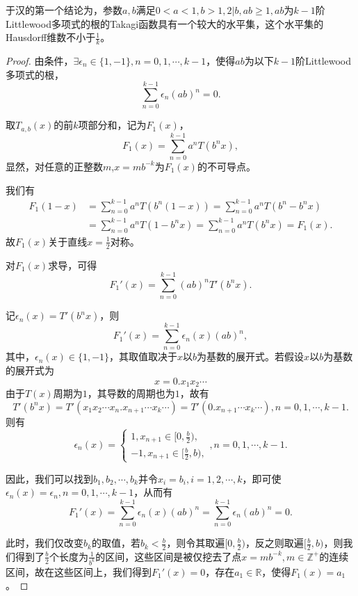 于汉的第一个结论为，参数$a,b$满足$0<a<1,b>1,2|b,ab\ge1,ab$为$k-1$阶Littlewood多项式的根的Takagi函数具有一个较大的水平集，这个水平集的Hausdorff维数不小于$\frac{1}{k}$。

\begin{proof}
    由条件，$\exists\epsilon_n\in\{1,-1\},n=0,1,\cdots,k-1$，使得$ab$为以下$k-1$阶Littlewood多项式的根，
    $$
        \sum_{n=0}^{k-1}\epsilon_n(ab)^n=0.
    $$

    取$T_{a,b}(x)$的前$k$项部分和，记为$F_1(x)$，
    $$
        F_1(x)=\sum_{n=0}^{k-1}a^nT(b^nx),
    $$
    显然，对任意的正整数$m$,$x=mb^{-k}$为$F_1(x)$的不可导点。

    我们有
    $$
        \begin{aligned}
            F_1(1-x) & =\sum_{n=0}^{k-1}a^nT(b^n(1-x))=\sum_{n=0}^{k-1}a^nT(b^n-b^nx) \\
                   & =\sum_{n=0}^{k-1}a^nT(1-b^nx)=\sum_{n=0}^{k-1}a^nT(b^nx)=F_1(x).
        \end{aligned}
    $$
    故$F_1(x)$关于直线$x=\frac{1}{2}$对称。

    对$F_1(x)$求导，可得
    $$
        F_1'(x)=\sum_{n=0}^{k-1}(ab)^nT'(b^nx).
    $$

    记$\epsilon_n(x)=T'(b^nx)$，则
    $$
        F_1'(x)=\sum_{n=0}^{k-1}\epsilon_n(x)(ab)^n,
    $$
    其中，$\epsilon_n(x)\in\{1,-1\}$，其取值取决于$x$以$b$为基数的展开式。若假设$x$以$b$为基数的展开式为
    $$
        x=0.x_1x_2\cdots
    $$
    由于$T(x)$周期为$1$，其导数的周期也为$1$，故有
    $$
        T'(b^nx)=T'(x_1x_2\cdots x_n.x_{n+1}\cdots x_k\cdots)=T'(0.x_{n+1}\cdots x_k\cdots),n=0,1,\cdots,k-1.
    $$
    则有
    $$
        \epsilon_n(x)=
        \begin{cases}
            1,x_{n+1}\in[0,\frac{b}{2}),\\
            -1,x_{n+1}\in[\frac{b}{2},b),
        \end{cases},n=0,1,\cdots,k-1.
    $$

    因此，我们可以找到$b_1,b_2,\cdots,b_k$并令$x_i=b_i,i=1,2,\cdots,k$，即可使$\epsilon_n(x)=\epsilon_n,n=0,1,\cdots,k-1$，从而有
    $$
        F_1'(x)=\sum_{n=0}^{k-1}\epsilon_n(x)(ab)^n=\sum_{n=0}^{k-1}\epsilon_n(ab)^n=0.
    $$

    此时，我们仅改变$b_k$的取值，若$b_k<\frac{b}{2}$，则令其取遍$[0,\frac{b}{2})$，反之则取遍$[\frac{b}{2},b)$，则我们得到了$\frac{b}{2}$个长度为$\frac{1}{b^k}$的区间，这些区间是被仅挖去了点$x=mb^{-k},m\in\mathbb{Z}^+$的连续区间，故在这些区间上，我们得到$F_1'(x)=0$，存在$a_1\in\mathbb{R}$，使得$F_1(x)=a_1$。


\end{proof}
